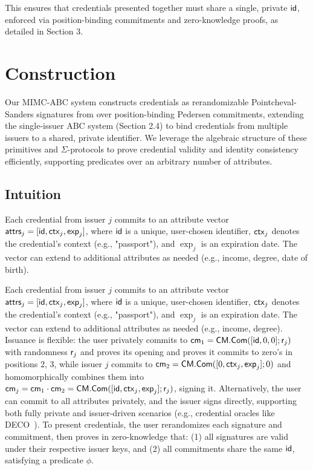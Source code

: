 This ensures that credentials presented together must share a single, private $\mathsf{id}$, enforced via position-binding commitments and zero-knowledge proofs, as detailed in Section 3.













\section{Construction}

Our MIMC-ABC system constructs credentials as rerandomizable Pointcheval-Sanders signatures from \cite{tomescu_utt_2022} over position-binding Pedersen commitments, extending the single-issuer ABC system (Section 2.4) to bind credentials from multiple issuers to a shared, private identifier. We leverage the algebraic structure of these primitives and $\Sigma$-protocols to prove credential validity and identity consistency efficiently, supporting predicates over an arbitrary number of attributes.

\subsection{Intuition}

Each credential from issuer $j$ commits to an attribute vector $\mathsf{attrs}_j = [\mathsf{id}, \mathsf{ctx}_j, \mathsf{exp}_j]$, where $\mathsf{id}$ is a unique, user-chosen identifier, $\mathsf{ctx}_j$ denotes the credential’s context (e.g., "passport"), and $\exp_j$ is an expiration date. The vector can extend to additional attributes as needed (e.g., income, degree, date of birth). 

Each credential from issuer $j$ commits to an attribute vector $\mathsf{attrs}_j = [\mathsf{id}, \mathsf{ctx}_j, \mathsf{exp}_j]$, where $\mathsf{id}$ is a unique, user-chosen identifier, $\mathsf{ctx}_j$ denotes the credential’s context (e.g., "passport"), and $\exp_j$ is an expiration date. The vector can extend to additional attributes as needed (e.g., income, degree). Issuance is flexible: the user privately commits to $\mathsf{cm}_1 = \mathsf{CM.Com}([\mathsf{id}, 0, 0]; \mathsf{r}_j)$ with randomness $\mathsf{r}_j$ and proves its opening and proves it commits to zero's in positions 2, 3, while issuer $j$ commits to $\mathsf{cm}_2 = \mathsf{CM.Com}([0, \mathsf{ctx}_j, \mathsf{exp}_j]; 0)$ and homomorphically combines them into $\mathsf{cm}_j = \mathsf{cm}_1 \cdot \mathsf{cm}_2 = \mathsf{CM.Com}([\mathsf{id}, \mathsf{ctx}_j, \mathsf{exp}_j]; \mathsf{r}_j)$, signing it. Alternatively, the user can commit to all attributes privately, and the issuer signs directly, supporting both fully private and issuer-driven scenarios (e.g., credential oracles like DECO~\cite{zhang_deco_2020}). To present credentials, the user rerandomizes each signature and commitment, then proves in zero-knowledge that: (1) all signatures are valid under their respective issuer keys, and (2) all commitments share the same $\mathsf{id}$, satisfying a predicate $\phi$.


